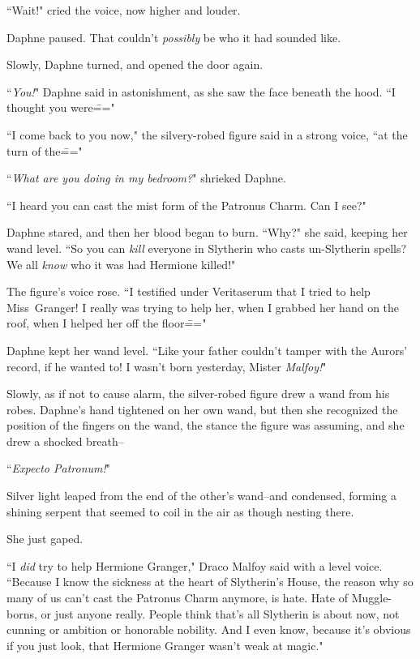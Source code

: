 ``Wait!" cried the voice, now higher and louder.

Daphne paused. That couldn't \emph{possibly} be who it had sounded like.

Slowly, Daphne turned, and opened the door again.

``\emph{You!}" Daphne said in astonishment, as she saw the face beneath the hood. ``I thought you were\==="

``I come back to you now," the silvery-robed figure said in a strong voice, ``at the turn of the\==="

``\emph{What are you doing in my bedroom?}" shrieked Daphne.

``I heard you can cast the mist form of the Patronus Charm. Can I see?"

Daphne stared, and then her blood began to burn. ``Why?" she said, keeping her wand level. ``So you can \emph{kill} everyone in Slytherin who casts un-Slytherin spells? We all \emph{know} who it was had Hermione killed!"

The figure's voice rose. ``I testified under Veritaserum that I tried to help Miss~Granger! I really was trying to help her, when I grabbed her hand on the roof, when I helped her off the floor\==="

Daphne kept her wand level. ``Like your father couldn't tamper with the Aurors' record, if he wanted to! I wasn't born yesterday, Mister \emph{Malfoy!}"

Slowly, as if not to cause alarm, the silver-robed figure drew a wand from his robes. Daphne's hand tightened on her own wand, but then she recognized the position of the fingers on the wand, the stance the figure was assuming, and she drew a shocked breath\---

``\emph{Expecto Patronum!}"

Silver light leaped from the end of the other's wand\---and condensed, forming a shining serpent that seemed to coil in the air as though nesting there.

She just gaped.

``I \emph{did} try to help Hermione Granger," Draco Malfoy said with a level voice. ``Because I know the sickness at the heart of Slytherin's House, the reason why so many of us can't cast the Patronus Charm anymore, is hate. Hate of Muggle-borns, or just anyone really. People think that's all Slytherin is about now, not cunning or ambition or honorable nobility. And I even know, because it's obvious if you just look, that Hermione Granger wasn't weak at magic."

